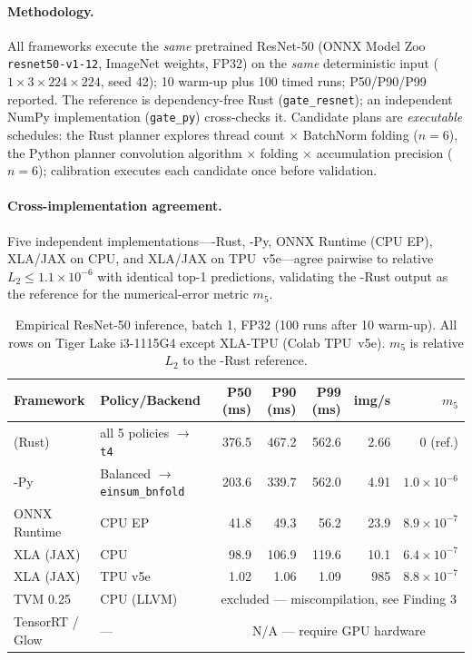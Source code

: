\paragraph{Methodology.}
All frameworks execute the \emph{same} pretrained ResNet-50 (ONNX Model
Zoo \texttt{resnet50-v1-12}, ImageNet weights, FP32) on the \emph{same}
deterministic input ($1{\times}3{\times}224{\times}224$, seed 42);
10 warm-up plus 100 timed runs; P50/P90/P99 reported. The \gate{}
reference is dependency-free Rust (\texttt{gate\_resnet}); an
independent NumPy implementation (\texttt{gate\_py}) cross-checks it.
Candidate plans are \emph{executable} schedules: the Rust planner
explores thread count $\times$ BatchNorm folding ($n = 6$), the Python
planner convolution algorithm $\times$ folding $\times$ accumulation
precision ($n = 6$); calibration executes each candidate once before
validation.

\paragraph{Cross-implementation agreement.}
Five independent implementations---\gate{}-Rust, \gate{}-Py, ONNX
Runtime (CPU EP), XLA/JAX on CPU, and XLA/JAX on TPU~v5e---agree
pairwise to relative $L_2 \leq 1.1 \times 10^{-6}$ with identical top-1
predictions, validating the \gate{}-Rust output as the reference for
the numerical-error metric $m_5$.

\begin{table}[H]
\centering
\small
\caption{Empirical ResNet-50 inference, batch 1, FP32 (100 runs after
10 warm-up). All rows on Tiger Lake i3-1115G4 except XLA-TPU (Colab
TPU~v5e). $m_5$ is relative $L_2$ to the \gate{}-Rust reference.}
\label{tab:empirical}
\begin{tabular}{@{}llrrrrr@{}}
\toprule
Framework & Policy/Backend & P50 (ms) & P90 (ms) & P99 (ms) & img/s & $m_5$ \\
\midrule
\gate{} (Rust)   & all 5 policies $\to$ \texttt{t4} & 376.5 & 467.2 & 562.6 & 2.66 & 0 (ref.) \\
\gate{}-Py       & Balanced $\to$ \texttt{einsum\_bnfold} & 203.6 & 339.7 & 562.0 & 4.91 & $1.0\times10^{-6}$ \\
ONNX Runtime     & CPU EP        & 41.8  & 49.3  & 56.2  & 23.9 & $8.9\times10^{-7}$ \\
XLA (JAX)        & CPU           & 98.9  & 106.9 & 119.6 & 10.1 & $6.4\times10^{-7}$ \\
XLA (JAX)        & TPU v5e       & 1.02  & 1.06  & 1.09  & 985  & $8.8\times10^{-7}$ \\
TVM 0.25         & CPU (LLVM)    & \multicolumn{5}{c}{excluded --- miscompilation, see Finding 3} \\
TensorRT / Glow  & ---           & \multicolumn{5}{c}{N/A --- require GPU hardware} \\
\bottomrule
\end{tabular}
\end{table}

